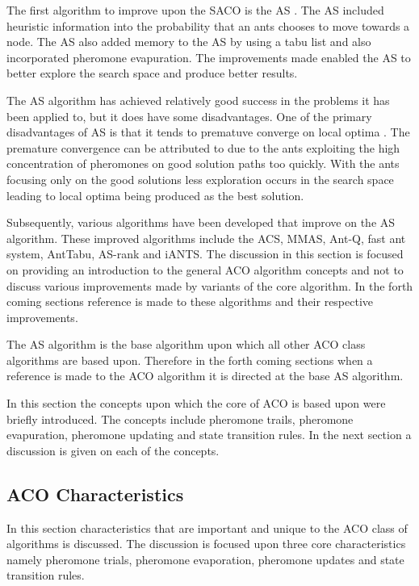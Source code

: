 The first algorithm to improve upon the \gls{SACO} is the \gls{AS} \cite{CompuIntelligenceIntro,AntIntroTrends}. The \gls{AS} included heuristic information into the probability that an ants chooses to move towards a node. The \gls{AS} also added memory to the \gls{AS} by using a tabu list and also incorporated pheromone evapuration. The improvements made enabled the \gls{AS} to better explore the search space and produce better results\cite{CompuIntelligenceIntro,AntIntroTrends}. 

The \gls{AS} algorithm has achieved relatively good success in the problems it has been applied to, but it does have some disadvantages\cite{ImpACOComplex,ACOSurvey}. One of the primary disadvantages of \gls{AS} is that it tends to prematuve converge on local optima \cite{FundamentalSwarm,ImpACOComplex}. The premature convergence can be attributed to due to the ants exploiting the high concentration of pheromones on good solution paths too quickly\cite{FundamentalSwarm}. With the ants focusing only on the good solutions less exploration occurs in the search space leading to local optima being produced as the best solution\cite{FundamentalSwarm}.

Subsequently, various algorithms have been developed that improve on the \gls{AS} algorithm. These improved algorithms include the \gls{ACS}, \gls{MMAS}, Ant-Q, fast ant system, AntTabu, \gls{AS}-rank and i\gls{ANTS}\cite{CompuIntelligenceIntro,AntIntroTrends}. The discussion in this section is focused on providing an introduction to the general \gls{ACO} algorithm concepts and not to discuss various improvements made by variants of the core algorithm. In the forth coming sections reference is made to these algorithms and their respective improvements.

The \gls{AS} algorithm is the base algorithm upon which all other \gls{ACO} class algorithms are based upon. Therefore in the forth coming sections when a reference is made to the \gls{ACO} algorithm it is directed at the base \gls{AS} algorithm.

In this section the concepts  upon which the core of \gls{ACO} is based upon were briefly introduced. The concepts include pheromone trails, pheromone evapuration, pheromone updating and state transition rules. In the next section a discussion is given on each of the concepts.
\subsection{ACO Characteristics}
\label{sec:ACOcharacter}
In this section characteristics that are important and unique to the \gls{ACO} class of algorithms is discussed. The discussion is focused upon three core characteristics namely pheromone trials, pheromone evaporation, pheromone updates and state transition rules.
